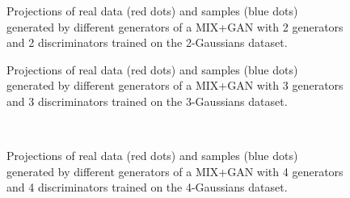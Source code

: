 \documentclass[conference]{IEEEtran}
\begin{document}
\begin{figure}[!h]
	\begin{center}
	\end{center}
	\caption{Projections of real data (red dots) and samples (blue dots) generated by different generators of a MIX+GAN with 2 generators and 2 discriminators trained on the 2-Gaussians dataset.}
	\label{2G2D}
\end{figure}

\begin{figure}[!h]
	\begin{center}
	\end{center}
	\caption{Projections of real data (red dots) and samples (blue dots) generated by different generators of a MIX+GAN with 3 generators and 3 discriminators trained on the 3-Gaussians dataset.}
	\label{3G3D}
\end{figure}

\begin{figure}[!h]
	\begin{center}
		\\
	\end{center}
	\caption{Projections of real data (red dots) and samples (blue dots) generated by different generators of a MIX+GAN with 4 generators and 4 discriminators trained on the 4-Gaussians dataset.}
	\label{4G4D}
\end{figure}
\end{document}
